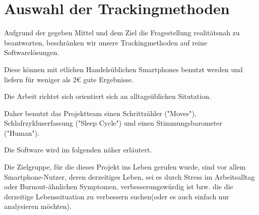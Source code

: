 \section{Auswahl der Trackingmethoden}
\label{ch:Einleitung:sec:auswahl-der-trackingmethoden}

Aufgrund der gegeben Mittel und dem Ziel die Fragestellung realitätsnah zu beantworten, beschränken wir unsere Trackingmethoden auf reine Softwarelösungen. 

Diese können mit etlichen Handelsüblichen Smartphones benutzt werden und liefern für weniger als 2\euro{} gute Ergebnisse. 

Die Arbeit richtet sich orientiert sich an alltagsüblichen Situtation. 

Daher benutzt das Projektteam einen Schrittzähler ("Moves"), Schlafrzykluserfassung ("Sleep Cycle") und einen Stimmungsbarometer ("Human").

Die Software wird im folgenden näher erläutert.

Die Zielgruppe, für die dieses Projekt ins Leben gerufen wurde, sind vor allem Smartphone-Nutzer, deren derzeitiges Leben, sei es durch Stress im Arbeitsalltag oder Burnout-ähnlichen Symptomen, verbesserungswürdig ist bzw. die die derzeitige Lebenssituation zu verbessern suchen(oder es auch einfach nur analysieren möchten).  

